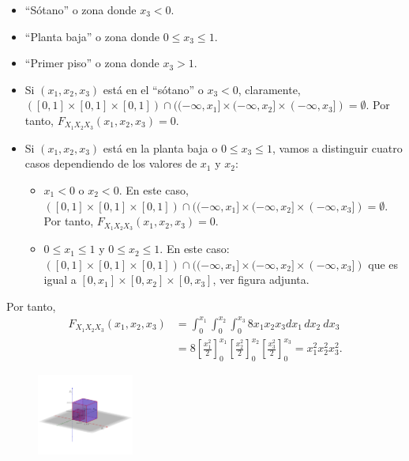 \documentclass[]{book}
\providecommand{\tightlist}{%
  \setlength{\itemsep}{0pt}\setlength{\parskip}{0pt}}
\begin{document}
\begin{itemize}
\item
  ``Sótano'' o zona donde \(x_3<0\).
\item
  ``Planta baja'' o zona donde \(0\leq x_3\leq 1\).
\item
  ``Primer piso'' o zona donde \(x_3>1\).
\item
  Si \((x_1,x_2,x_3)\) está en el ``sótano'' o \(x_3<0\), claramente, \(([0,1]\times [0,1]\times [0,1])\cap ((-\infty,x_1]\times (-\infty,x_2]\times (-\infty,x_3])=\emptyset\). Por tanto, \(F_{X_1X_2X_3}(x_1,x_2,x_3)=0\).
\item
  Si \((x_1,x_2,x_3)\) está en la planta baja o \(0\leq x_3\leq 1\), vamos a distinguir cuatro casos dependiendo de los valores de \(x_1\) y \(x_2\):

  \begin{itemize}
  \tightlist
  \item
    \(x_1 <0\) o \(x_2 <0\). En este caso, \(([0,1]\times [0,1]\times [0,1])\cap ((-\infty,x_1]\times (-\infty,x_2]\times (-\infty,x_3])=\emptyset\). Por tanto, \(F_{X_1X_2X_3}(x_1,x_2,x_3)=0\).
  \item
    \(0\leq x_1\leq 1\) y \(0\leq x_2\leq 1\). En este caso:
    \(([0,1]\times [0,1]\times [0,1])\cap ((-\infty,x_1]\times (-\infty,x_2]\times (-\infty,x_3])\) que es igual a \([0,x_1]\times [0,x_2]\times [0,x_3]\), ver figura adjunta.
  \end{itemize}
\end{itemize}

Por tanto,
\[
\begin{array}{rl}
F_{X_1X_2X_3}(x_1,x_2,x_3) & =\int_{0}^{x_1}\int_{0}^{x_2}\int_{0}^{x_3} 8 x_1 x_2 x_3 dx_1\, dx_2\ dx_3\\
& = 8\left[\frac{x_1^2}{2}\right]_0^{x_1}\left[\frac{x_2^2}{2}\right]_0^{x_2}\left[\frac{x_3^2}{2}\right]_0^{x_3} = x_1^2 x_2^2 x_3^2.
\end{array}
\]

\begin{figure}

{\centering \includegraphics[width=1.25in]{Images/Fx1x2x3bajos} 

}

\end{figure}
\end{document}
